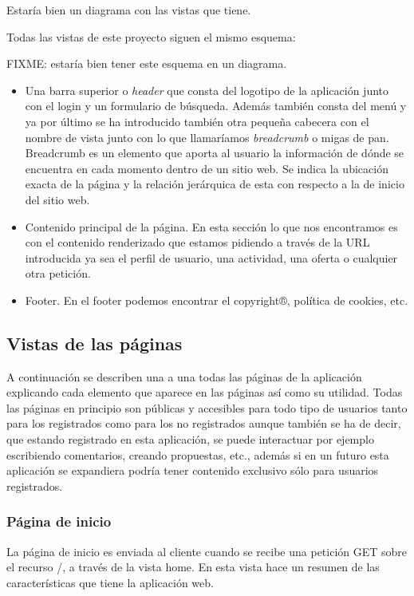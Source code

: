 Estaría bien un diagrama con las vistas que tiene.


Todas las vistas de este proyecto siguen el mismo esquema:

FIXME: estaría bien tener este esquema en un diagrama.


\begin{itemize}
\item Una barra superior o \textit{header} que consta del logotipo de la aplicación junto con el login y un formulario de búsqueda. Además también consta del menú y ya por último se ha introducido también otra pequeña cabecera con el nombre de vista junto con lo que llamaríamos \textit{breadcrumb} o migas de pan.  Breadcrumb es un elemento que aporta al usuario la información de dónde se encuentra en cada momento dentro de un sitio web. Se indica la ubicación exacta de la página y la relación jerárquica de esta con respecto a la de inicio del sitio web.
\item Contenido principal de la página. En esta sección lo que nos encontramos es con el contenido renderizado que estamos pidiendo a través de la URL introducida ya sea el perfil de usuario, una actividad, una oferta o cualquier otra petición.
\item Footer. En el footer podemos encontrar el copyright®, política de cookies, etc.
\end{itemize}


\subsection{Vistas de las páginas} 
\label{subsec:vistas}

A continuación se describen una a una todas las páginas de la aplicación explicando cada elemento que aparece en las páginas así como su utilidad. Todas las páginas en principio son públicas y accesibles para todo tipo de usuarios tanto para los registrados como para los no registrados aunque también se ha de decir, que estando registrado en esta aplicación, se puede interactuar por ejemplo escribiendo comentarios, creando propuestas, etc., además si en un futuro esta aplicación se expandiera podría tener contenido exclusivo sólo para usuarios registrados.


\subsubsection{Página de inicio}
\label{subsubsec:home}


La página de inicio es enviada al cliente cuando se recibe una petición GET sobre el recurso /, a través de la vista home. En esta vista hace un resumen de las características que tiene la aplicación web.

